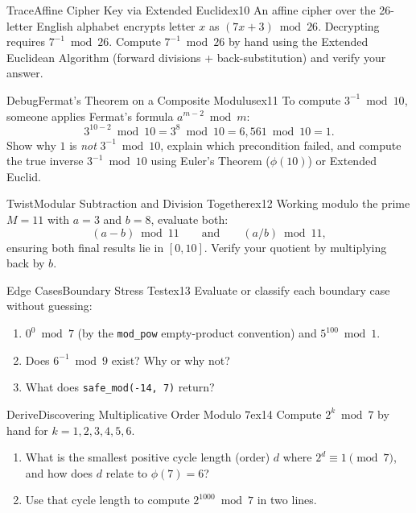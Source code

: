 \documentclass[11pt,a4paper]{article}
\theoremstyle{definition}
\begin{document}
\begin{tryitbox}{Trace}{Affine Cipher Key via Extended Euclid}{ex10}
An affine cipher over the 26-letter English alphabet encrypts letter $x$ as $(7x + 3) \bmod 26$. Decrypting requires $7^{-1} \bmod 26$. Compute $7^{-1} \bmod 26$ by hand using the Extended Euclidean Algorithm (forward divisions + back-substitution) and verify your answer.
\end{tryitbox}

\begin{tryitbox}{Debug}{Fermat's Theorem on a Composite Modulus}{ex11}
To compute $3^{-1} \bmod 10$, someone applies Fermat's formula $a^{m - 2} \bmod m$:
\[
    3^{10 - 2} \bmod 10 = 3^8 \bmod 10 = 6{,}561 \bmod 10 = 1.
\]
Show why $1$ is \emph{not} $3^{-1} \bmod 10$, explain which precondition failed, and compute the true inverse $3^{-1} \bmod 10$ using Euler's Theorem ($\phi(10)$) or Extended Euclid.
\end{tryitbox}

\begin{tryitbox}{Twist}{Modular Subtraction and Division Together}{ex12}
Working modulo the prime $M = 11$ with $a = 3$ and $b = 8$, evaluate both:
\[
    (a - b) \bmod 11 \qquad \text{and} \qquad (a / b) \bmod 11,
\]
ensuring both final results lie in $[0, 10]$. Verify your quotient by multiplying back by $b$.
\end{tryitbox}

\begin{tryitbox}{Edge Cases}{Boundary Stress Test}{ex13}
Evaluate or classify each boundary case without guessing:
\begin{enumerate}
    \item $0^0 \bmod 7$ (by the \texttt{mod\_pow} empty-product convention) and $5^{100} \bmod 1$.
    \item Does $6^{-1} \bmod 9$ exist? Why or why not?
    \item What does \texttt{safe\_mod(-14, 7)} return?
\end{enumerate}
\end{tryitbox}

\begin{tryitbox}{Derive}{Discovering Multiplicative Order Modulo $7$}{ex14}
Compute $2^k \bmod 7$ by hand for $k = 1, 2, 3, 4, 5, 6$.
\begin{enumerate}
    \item What is the smallest positive cycle length (order) $d$ where $2^d \equiv 1 \pmod 7$, and how does $d$ relate to $\phi(7) = 6$?
    \item Use that cycle length to compute $2^{1000} \bmod 7$ in two lines.
\end{enumerate}
\end{tryitbox}
\end{document}
